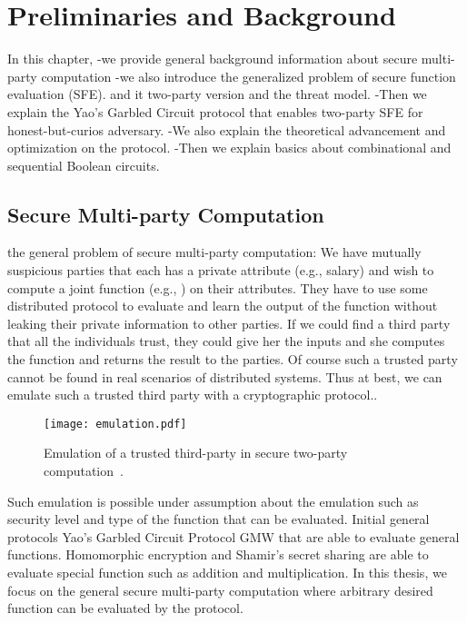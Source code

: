 \chapter{Preliminaries and Background}
In this chapter,
-we provide general background information about secure multi-party computation
-we also introduce the generalized problem of secure function evaluation (SFE). and it two-party version and the threat model.
-Then we explain the Yao's Garbled Circuit protocol that enables two-party SFE for honest-but-curios adversary.
-We also explain the theoretical advancement and optimization on the protocol.
-Then we explain basics about combinational and sequential Boolean circuits.

\section{Secure Multi-party Computation}
the general problem of secure multi-party computation:
We have mutually suspicious parties that each has a private attribute (e.g., salary) and wish to compute a joint function (e.g., ) on their attributes.
They have to use some distributed protocol to evaluate and learn the output of the function without leaking their private information to other parties.
If we could find a third party that all the individuals trust, they could give her the inputs and she computes the function and returns the result to the parties.
Of course such a trusted party cannot be found in real scenarios of distributed systems.
Thus at best, we can emulate such a trusted third party with a cryptographic protocol.\cite{goldreich2013general}.

\begin{figure}[ht]
\centering
\texttt{[image: emulation.pdf]}
\caption{Emulation of a trusted third-party in secure two-party computation~\cite{goldreich2013general}.}
\label{fig:globalflow}
\end{figure}

Such emulation is possible under assumption about the emulation such as security level and type of the function that can be evaluated.
Initial general protocols Yao's Garbled Circuit Protocol GMW that are able to evaluate general functions.
Homomorphic encryption and Shamir's secret sharing are able to evaluate special function such as addition and multiplication.
In this thesis, we focus on the general secure multi-party computation where arbitrary desired function can be evaluated by the protocol.

